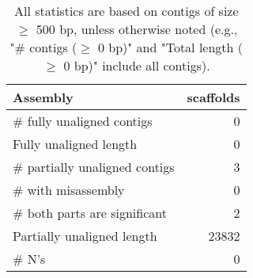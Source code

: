 \documentclass[12pt,a4paper]{article}
\begin{document}
\begin{table}[ht]
\begin{center}
\caption{All statistics are based on contigs of size $\geq$ 500 bp, unless otherwise noted (e.g., "\# contigs ($\geq$ 0 bp)" and "Total length ($\geq$ 0 bp)" include all contigs).}
\begin{tabular}{|l*{1}{|r}|}
\hline
Assembly & scaffolds \\ \hline
\# fully unaligned contigs & 0 \\ \hline
Fully unaligned length & 0 \\ \hline
\# partially unaligned contigs & 3 \\ \hline
\hspace{5mm}\# with misassembly & 0 \\ \hline
\hspace{5mm}\# both parts are significant & 2 \\ \hline
Partially unaligned length & 23832 \\ \hline
\# N's & 0 \\ \hline
\end{tabular}
\end{center}
\end{table}
\end{document}
